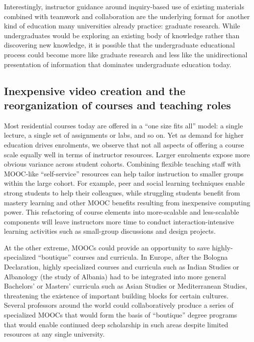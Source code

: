 Interestingly, instructor guidance around
inquiry-based use of existing materials combined with teamwork and
collaboration are the underlying format for another kind of education many
universities already practice:
graduate research.  While undergraduates would be exploring an existing
body of knowledge rather than discovering new knowledge, it is possible
that the undergraduate educational process could become more like
graduate research and less like the unidirectional presentation of information
that dominates undergraduate education today.


\subsection{Inexpensive video creation and the reorganization of courses
  and teaching roles}

Most residential courses today are offered in a ``one size fits all''
model: a single lecture, a single set of assignments or labs, and so on.
Yet as demand for higher education drives enrolments, we observe that
not all aspects of offering a course scale equally well in terms of
instructor resources.
Larger enrolments expose more obvious variance across student cohorts.
Combining flexible teaching staff with MOOC-like ``self-service''
resources can help tailor instruction to smaller groups within the large
cohort.   For example, peer and social learning techniques enable
strong students to help their colleagues, while struggling students 
benefit from mastery learning and other MOOC benefits resulting from
inexpensive computing power.
This refactoring of course elements into more-scalable and less-scalable
components
will leave instructors more time to conduct
interaction-intensive learning activities such as small-group 
discussions and design projects.

At the other extreme, MOOCs could provide an opportunity to save
highly-specialized ``boutique'' courses and curricula.
In Europe, after the Bologna Declaration, highly specialized courses and
curricula such as Indian Studies or Albanology (the study of Albania)
had to be integrated into more general Bachelors' or Masters' curricula
such as Asian Studies or Mediterranean Studies, threatening the
existence of important building blocks for certain cultures.
Several professors around the world could collaboratively produce a
series of specialized MOOCs that would form the basis of ``boutique''
degree programs that would enable continued deep scholarship in such
areas despite limited resources at any single university.

